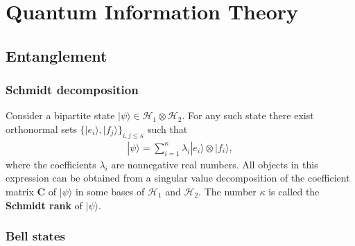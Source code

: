 \chapter{Quantum Information Theory}\label{chapter:quantum_computing}

\section{Entanglement}
\subsection{Schmidt decomposition}

    \begin{construct}
        Consider a bipartite state $|\psi\rangle\in\mathcal{H}_1\otimes\mathcal{H}_2$. For any such state there exist orthonormal sets $\big\{|e_i\rangle, |f_j\rangle\big\}_{i,j\leq\kappa}$ such that
        \begin{gather}
            |\psi\rangle = \sum_{i=1}^\kappa\lambda_i|e_i\rangle\otimes|f_i\rangle,
        \end{gather}
        where the coefficients $\lambda_i$ are nonnegative real numbers. All objects in this expression can be obtained from a singular value decomposition of the coefficient matrix $\mathbf{C}$ of $|\psi\rangle$ in some bases of $\mathcal{H}_1$ and $\mathcal{H}_2$. The number $\kappa$ is called the \textbf{Schmidt rank} of $|\psi\rangle$.
    \end{construct}


\subsection{Bell states}

